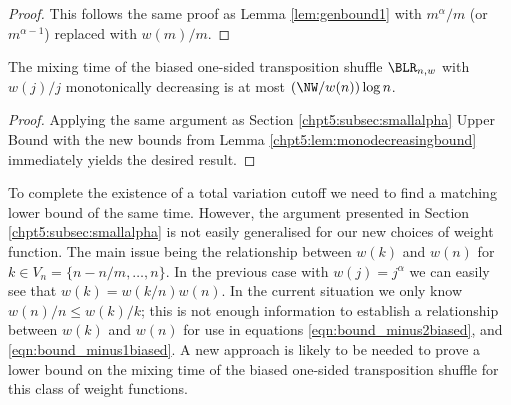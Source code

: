 \documentclass[11pt]{report}
\begin{document}
\begin{proof}
	This follows the same proof as Lemma \ref{lem:genbound1} with $m^{\alpha}/m$ (or $m^{\alpha-1}$) replaced with $w(m)/m$.
	
	
	
	
	
	
	
	
	
	
	
	
	
	
	
	
	
	
	
	
	
	
	
	
	
	
	
	
	
	
	
	
	
	
	
	
	
	
	
	
	
	
	
	
	
	
	
	
	
	
	
	
	
	
	
	
	
	
	
	
	
	
	
	
	
	
	
	
	
	
	
	
	
\end{proof}

\begin{corollary}
	The mixing time of the biased one-sided transposition shuffle $\BLR_{n,w}$ with $w(j)/j$ monotonically decreasing is at most $\left(\NW /w(n) \right) \log n$. 
\end{corollary}
\begin{proof}
	Applying the same argument as Section \ref{chpt5:subsec:smallalpha} Upper Bound with the new bounds from Lemma \ref{chpt5:lem:monodecreasingbound} immediately yields the desired result.
\end{proof}

To complete the existence of a total variation cutoff we need to find a matching lower bound of the same time. However, the argument presented in Section \ref{chpt5:subsec:smallalpha} is not easily generalised for our new choices of weight function. The main issue being the relationship between $w(k)$ and $w(n)$ for $k \in V_{n} = \{n - n/m,\ldots, n\}$. In the previous case with $w(j) = j^{\alpha}$ we can easily see that $w(k) = w(k/n) w(n)$. In the current situation we only know $w(n)/n \leq w(k) /k$; this is not enough information to establish a relationship between $w(k)$ and $w(n)$ for use in equations \eqref{eqn:bound_minus2biased}, and \eqref{eqn:bound_minus1biased}. A new approach is likely to be needed to prove a lower bound on the mixing time of the biased one-sided transposition shuffle for this class of weight functions.
\end{document}
